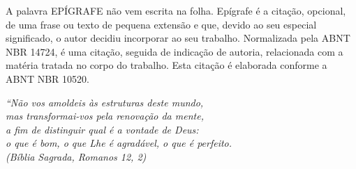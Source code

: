 \begin{epigrafe}
  A palavra EPÍGRAFE não vem escrita na folha.
  Epígrafe é a citação, opcional, de uma frase ou texto de pequena extensão e que, devido ao
  seu especial significado, o autor decidiu incorporar ao
  seu trabalho. Normalizada pela ABNT NBR 14724, é uma citação,
  seguida de indicação de autoria, relacionada com a matéria tratada no corpo do trabalho.
  Esta citação é elaborada conforme a ABNT NBR 10520. 	
  
  
  
      \vspace*{\fill}
    \begin{flushright}
      \textit{``Não vos amoldeis às estruturas deste mundo, \\
      mas transformai-vos pela renovação da mente, \\
      a fim de distinguir qual é a vontade de Deus: \\
      o que é bom, o que Lhe é agradável, o que é perfeito.\\
      (Bíblia Sagrada, Romanos 12, 2)}
    \end{flushright}
  \end{epigrafe}
